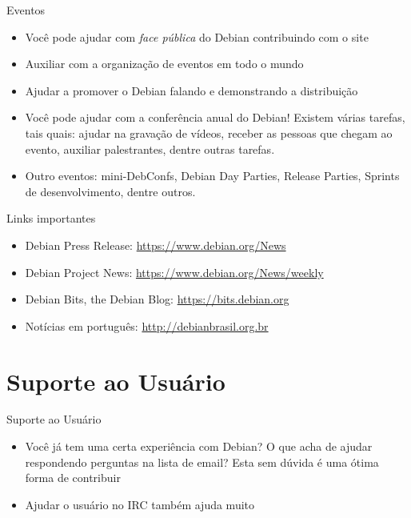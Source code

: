 \documentclass[10pt, compress, aspectratio=169]{beamer}
\begin{document}
\begin{frame}{Eventos}
  \begin{itemize}
    \item Você pode ajudar com \textit{face pública} do Debian contribuindo com
          o site
    \item Auxiliar com a organização de eventos em todo o mundo
    \item Ajudar a promover o Debian falando e demonstrando a distribuição
    \item Você pode ajudar com a conferência anual do Debian! Existem várias
          tarefas, tais quais: ajudar na gravação de vídeos, receber as pessoas
          que chegam ao evento, auxiliar palestrantes, dentre outras tarefas.
    \item Outro eventos: mini-DebConfs, Debian Day Parties, Release Parties,
          Sprints de desenvolvimento, dentre outros.
  \end{itemize}

  \begin{exampleblock}{Links importantes}
    \begin{itemize}
      \item Debian Press Release: \url{https://www.debian.org/News}
      \item Debian Project News: \url{https://www.debian.org/News/weekly}
      \item Debian Bits, the Debian Blog: \url{https://bits.debian.org}
      \item Notícias em português: \url{http://debianbrasil.org.br}
    \end{itemize}
  \end{exampleblock}

\end{frame}

\section{Suporte ao Usuário}

\begin{frame}{Suporte ao Usuário}
  \begin{itemize}
    \item Você já tem uma certa experiência com Debian? O que acha de ajudar
          respondendo perguntas na lista de email? Esta sem dúvida é uma ótima
          forma de contribuir
    \item Ajudar o usuário no IRC também ajuda muito
  \end{itemize}
\end{frame}
\end{document}
